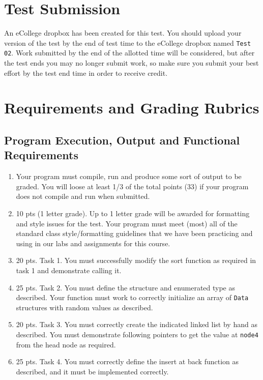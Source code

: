 \documentclass[11pt]{article}
\begin{document}
\section*{Test Submission}
\label{sec-3}


An eCollege dropbox has been created for this test.  You should upload
your version of the test by the end of test time to the eCollege
dropbox named \verb~Test 02~.  Work submitted by the end of the allotted
time will be considered, but after the test ends you may no longer
submit work, so make sure you submit your best effort by the test end
time in order to receive credit.
\section*{Requirements and Grading Rubrics}
\label{sec-4}
\subsection*{Program Execution, Output and Functional Requirements}
\label{sec-4-1}


\begin{enumerate}
\item Your program must compile, run and produce some sort of output to
   be graded. You will loose at least 1/3 of the total points (33) if
   your program does not compile and run when submitted.
\item 10 pts (1 letter grade).  Up to 1 letter grade will be awarded for
   formatting and style issues for the test.  Your program must meet
   (most) all of the standard class style/formatting guidelines that
   we have been practicing and using in our labs and assignments for
   this course.
\item 20 pts. Task 1.  You must successfully modify the sort function as
   required in task 1 and demonstrate calling it.
\item 25 pts.  Task 2.  You must define the structure and enumerated type
   as described.  Your function must work to correctly initialize
   an array of \verb~Data~ structures with random values as described.
\item 20 pts. Task 3.  You must correctly create the indicated linked
   list by hand as described.  You must demonstrate following
   pointers to get the value at \verb~node4~ from the head node as
   required.
\item 25 pts.  Task 4. You must correctly define the insert at back
   function as described, and it must be implemented correctly.
\end{enumerate}
\end{document}
